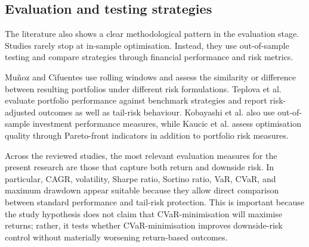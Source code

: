 \subsection{Evaluation and testing strategies}
\label{subsec:lit-evaluation}
\par The literature also shows a clear methodological pattern in the evaluation stage. Studies rarely stop at in-sample optimisation. Instead, they use out-of-sample testing and compare strategies through financial performance and risk metrics.
\par Muñoz and Cifuentes \cite{munoz2026riskmetrics} use rolling windows and assess the similarity or difference between resulting portfolios under different risk formulations. Teplova et al. \cite{teplova2023blcopula} evaluate portfolio performance against benchmark strategies and report risk-adjusted outcomes as well as tail-risk behaviour. Kobayashi et al. \cite{kobayashi2023cardinalitydro} also use out-of-sample investment performance measures, while Kaucic et al. \cite{kaucic2019riskmeasures} assess optimisation quality through Pareto-front indicators in addition to portfolio risk measures.
\par Across the reviewed studies, the most relevant evaluation measures for the present research are those that capture both return and downside risk. In particular, CAGR, volatility, Sharpe ratio, Sortino ratio, VaR, CVaR, and maximum drawdown appear suitable because they allow direct comparison between standard performance and tail-risk protection. This is important because the study hypothesis does not claim that CVaR-minimisation will maximise returns; rather, it tests whether CVaR-minimisation improves downside-risk control without materially worsening return-based outcomes.

